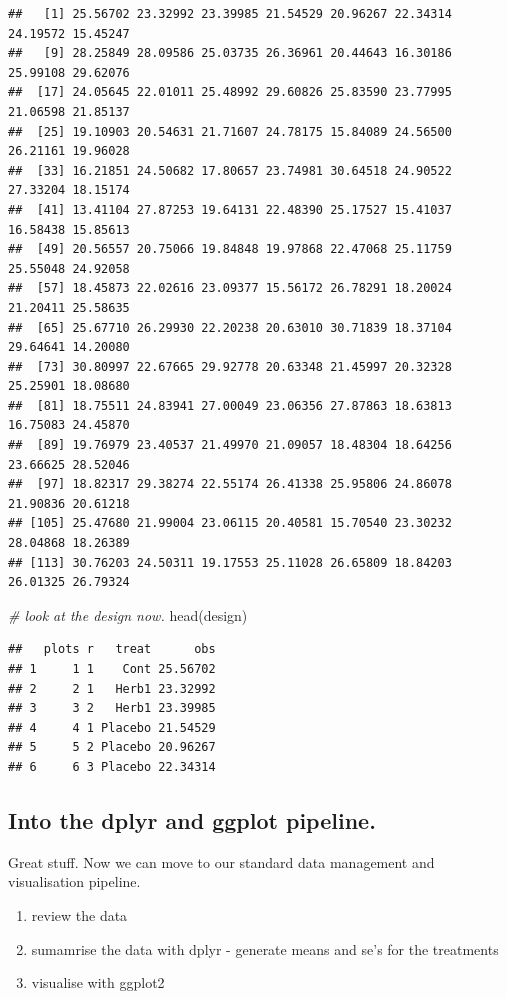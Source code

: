 \documentclass[
]{book}
\newenvironment{Shaded}{\begin{snugshade}}{\end{snugshade}}
\newcommand{\CommentTok}[1]{\textcolor[rgb]{0.56,0.35,0.01}{\textit{#1}}}
\newcommand{\FunctionTok}[1]{\textcolor[rgb]{0.00,0.00,0.00}{#1}}
\newcommand{\NormalTok}[1]{#1}
\providecommand{\tightlist}{%
  \setlength{\itemsep}{0pt}\setlength{\parskip}{0pt}}
\begin{document}
\begin{verbatim}
##   [1] 25.56702 23.32992 23.39985 21.54529 20.96267 22.34314 24.19572 15.45247
##   [9] 28.25849 28.09586 25.03735 26.36961 20.44643 16.30186 25.99108 29.62076
##  [17] 24.05645 22.01011 25.48992 29.60826 25.83590 23.77995 21.06598 21.85137
##  [25] 19.10903 20.54631 21.71607 24.78175 15.84089 24.56500 26.21161 19.96028
##  [33] 16.21851 24.50682 17.80657 23.74981 30.64518 24.90522 27.33204 18.15174
##  [41] 13.41104 27.87253 19.64131 22.48390 25.17527 15.41037 16.58438 15.85613
##  [49] 20.56557 20.75066 19.84848 19.97868 22.47068 25.11759 25.55048 24.92058
##  [57] 18.45873 22.02616 23.09377 15.56172 26.78291 18.20024 21.20411 25.58635
##  [65] 25.67710 26.29930 22.20238 20.63010 30.71839 18.37104 29.64641 14.20080
##  [73] 30.80997 22.67665 29.92778 20.63348 21.45997 20.32328 25.25901 18.08680
##  [81] 18.75511 24.83941 27.00049 23.06356 27.87863 18.63813 16.75083 24.45870
##  [89] 19.76979 23.40537 21.49970 21.09057 18.48304 18.64256 23.66625 28.52046
##  [97] 18.82317 29.38274 22.55174 26.41338 25.95806 24.86078 21.90836 20.61218
## [105] 25.47680 21.99004 23.06115 20.40581 15.70540 23.30232 28.04868 18.26389
## [113] 30.76203 24.50311 19.17553 25.11028 26.65809 18.84203 26.01325 26.79324
\end{verbatim}

\begin{Shaded}
\begin{Highlighting}[]
\CommentTok{\# look at the design now.}
\FunctionTok{head}\NormalTok{(design)}
\end{Highlighting}
\end{Shaded}

\begin{verbatim}
##   plots r   treat      obs
## 1     1 1    Cont 25.56702
## 2     2 1   Herb1 23.32992
## 3     3 2   Herb1 23.39985
## 4     4 1 Placebo 21.54529
## 5     5 2 Placebo 20.96267
## 6     6 3 Placebo 22.34314
\end{verbatim}

\hypertarget{into-the-dplyr-and-ggplot-pipeline.}{%
\subsection{Into the dplyr and ggplot pipeline.}\label{into-the-dplyr-and-ggplot-pipeline.}}

Great stuff. Now we can move to our standard data management and visualisation pipeline.

\begin{enumerate}
\def\labelenumi{\arabic{enumi}.}
\tightlist
\item
  review the data
\item
  sumamrise the data with dplyr - generate means and se's for the treatments
\item
  visualise with ggplot2
\end{enumerate}
\end{document}
